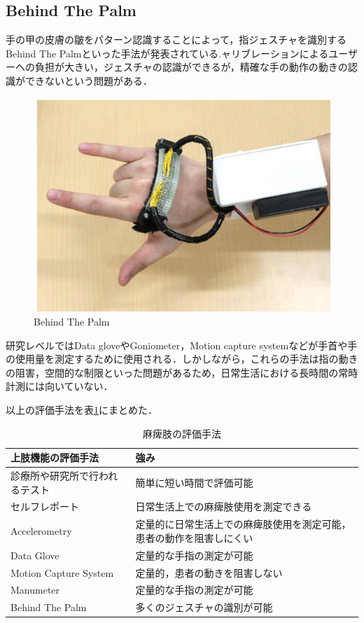 \subsection*{Behind The Palm}
手の甲の皮膚の皺をパターン認識することによって，指ジェスチャを識別するBehind The Palm\cite{Recognition2017}といった手法が発表されている.ャリブレーションによるユーザーへの負担が大きい，ジェスチャの認識ができるが，精確な手の動作の動きの認識ができないという問題がある．
\begin{figure}[H]
  \centering
  \includegraphics[width=0.6\linewidth]{fig/ch1/btp}
  \caption{Behind The Palm\cite{Recognition2017}}
  \label{fig:Behind The Palm}
\end{figure}

研究レベルではData gloveやGoniometer，Motion capture system\cite{Binh2014,Valtin2017,Chen2003,Ren2011}などが手首や手の使用量を測定するために使用される．しかしながら，これらの手法は指の動きの阻害，空間的な制限といった問題があるため，日常生活における長時間の常時計測には向いていない．

以上の評価手法を表\ref{table:measure}にまとめた．
\begin{table}[H]
  \caption{麻痺肢の評価手法}
  \label{table:measure}
  \centering
  \begin{tabular}{ll}
    \hline
    上肢機能の評価手法 & 強み\\
    \hline \hline 
    診療所や研究所で行われるテスト  & 簡単に短い時間で評価可能  \\
    セルフレポート & 日常生活上での麻痺肢使用を測定できる \\
    Accelerometry  & 定量的に日常生活上での麻痺肢使用を測定可能，患者の動作を阻害しにくい \\
    Data Glove  & 定量的な手指の測定が可能  \\
    Motion Capture System  & 定量的，患者の動きを阻害しない  \\
    Manumeter  & 定量的な手指の測定が可能 \\
    Behind The Palm  & 多くのジェスチャの識別が可能 \\ 
    \hline
  \end{tabular}
\end{table}

